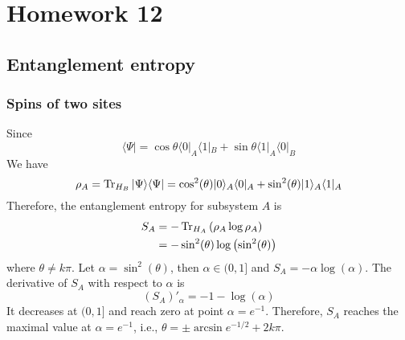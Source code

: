 \newpage
\section{Homework 12}
\subsection{Entanglement entropy}
\subsubsection{Spins of two sites}
Since 
\begin{equation}
	\langle \Psi | = \cos \theta \langle 0 |_A \langle 1|_B + \sin \theta \langle 1|_A \langle 0|_B
\end{equation}
We have 
\begin{equation}
	\rho_A = \operatorname{Tr}_{H_B} | \Psi\rangle \langle \Psi | = \cos^2(\theta) | 0\rangle_A \langle 0|_A + \sin^2(\theta) | 1 \rangle_A \langle 1 |_A
\end{equation}
Therefore, the entanglement entropy for subsystem $A$ is 
\begin{equation}
	\begin{split}
	S_A & = - \operatorname{Tr}_{H_A} \left( \rho_A \log \rho_A \right)\\
	& = - \sin^2(\theta) \log\left( \sin^2(\theta)\right)\\
	\end{split}
\end{equation}
where $\theta \neq k \pi $. Let $\alpha = \sin^2(\theta)$, then $\alpha \in (0, 1]$ and $S_A= - \alpha \log\left(\alpha\right)$. The derivative of $S_A$ with respect to $\alpha$ is
\begin{equation}
	(S_A)'_\alpha = -1 - \log(\alpha)
\end{equation} 
It decreases at $(0, 1]$ and reach zero at point $\alpha = e^{-1}$. Therefore, $S_A$ reaches the maximal value at $\alpha= e^{-1}$, i.e., $\theta =\pm \arcsin e^{-1/2}+ 2k\pi$.
